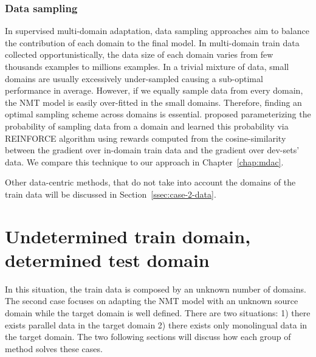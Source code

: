 \subsubsection{Data sampling}
In supervised multi-domain adaptation, data sampling approaches aim to balance the contribution of each domain to the final model. In multi-domain train data collected opportunistically, the data size of each domain varies from few thousands examples to millions examples. In a trivial mixture of data, small domains are usually excessively under-sampled causing a sub-optimal performance in average. However, if we equally sample data from every domain, the NMT model is easily over-fitted in the small domains. Therefore, finding an optimal sampling scheme across domains is essential. \citet{Wang20balancing} proposed parameterizing the probability of sampling data from a domain and learned this probability via REINFORCE algorithm \citet{Williams92simple} using rewards computed from the cosine-similarity between the gradient over in-domain train data and the gradient over dev-sets' data. We compare this technique to our approach in Chapter~\ref{chap:mdac}.

Other data-centric methods, that do not take into account the domains of the train data will be discussed in Section~\ref{ssec:case-2-data}.
\section{Undetermined train domain, determined test domain}
\label{sec:case2}
In this situation, the train data is composed by an unknown number of domains. The second case focuses on adapting the NMT model with an unknown source domain while the target domain is well defined. There are two situations: 1) there exists parallel data in the target domain 2) there exists only monolingual data in the target domain. The two following sections will discuss how each group of method solves these cases.
